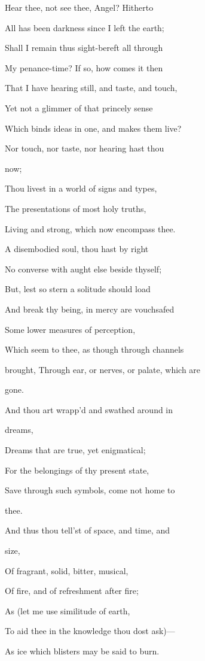 Hear thee, not see thee, Angel? Hitherto

All has been darkness since I left the earth;

Shall I remain thus sight-bereft all through

My penance-time? If so, how comes it then

That I have hearing still, and taste, and touch,

Yet not a glimmer of that princely sense

Which binds ideas in one, and makes them live?


Nor touch, nor taste, nor hearing hast thou

now;

Thou livest in a world of signs and types,

The presentations of most holy truths,

Living and strong, which now encompass thee.

A disembodied soul, thou hast by right

No converse with aught else beside thyself;

But, lest so stern a solitude should load

And break thy being, in mercy are vouchsafed

Some lower measures of perception,

Which seem to thee, as though through channels

brought, Through ear, or nerves, or palate, which are

gone.

And thou art wrapp'd and swathed around in

dreams,

Dreams that are true, yet enigmatical;

For the belongings of thy present state,

Save through such symbols, come not home to

thee.

And thus thou tell'st of space, and time, and

size,

Of fragrant, solid, bitter, musical,

Of fire, and of refreshment after fire;

As (let me use similitude of earth,

To aid thee in the knowledge thou dost ask)—

As ice which blisters may be said to burn.

